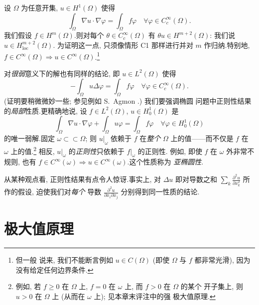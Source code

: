 \begin{remark}
\label{rem:9.25}
设 $\Omega$ 为任意开集, $u\in H^1(\Omega)$ 使得
\begin{equation*}
\int_\Omega\nabla u\cdot\nabla\varphi=\int_\Omega f\varphi
\quad\forall\varphi\in C_c^\infty(\Omega).
\end{equation*}
我们假设 $f\in H^m(\Omega)$.则对每个 $\theta\in C_c^\infty(\Omega)$ 有
$\theta u\in H^{m+2}(\Omega)$: 我们说 $u\in H^{m+2}_{\mathrm{loc}}(\Omega)$.
为证明这一点, 只须像情形 C1 那样进行并对 $m$ 作归纳.特别地,
$f\in C^\infty(\Omega)\Rightarrow u\in C^\infty(\Omega)$.\footnote{但一般
说来, 我们不能断言例如 $u\in C(\Omega)$ (即使 $\Omega$ 与 $f$ 都非常光滑),
因为没有给定任何边界条件.}

对\emph{很弱}意义下的解也有同样的结论, 即 $u\in L^2(\Omega)$ 使得
\begin{equation*}
-\int_\Omega u\Delta\varphi=\int_\Omega f\varphi
\quad\forall\varphi\in C_c^\infty(\Omega).
\end{equation*}
(证明要稍微微妙一些; 参见例如 S.~Agmon .) 我们要强调椭圆
问题中正则性结果的\emph{局部}性质.更精确地说, 设 $f\in L^2(\Omega)$,
$u\in H_0^1(\Omega)$ 是
\begin{equation*}
\int_\Omega\nabla u\cdot\nabla\varphi+\int_\Omega u\varphi
=\int_\Omega f\varphi\quad\forall\varphi\in H_0^1(\Omega)
\end{equation*}
的唯一弱解.固定 $\omega\subset\subset\Omega$; 则 $u|_\omega$ 依赖于 $f$
在\emph{整个} $\Omega$ 上的值——而不仅是 $f$ 在 $\omega$ 上的值.\footnote{例如,
若 $f\ge0$ 在 $\Omega$ 上, $f=0$ 在 $\omega$ 上, 而 $f>0$ 在 $\Omega$ 的某个
开子集上, 则 $u>0$ 在 $\Omega$ 上 (从而在 $\omega$ 上); 见本章末评注中的强
极大值原理.} 相反, $u|_\omega$ 的\emph{正则性}只依赖于 $f|_\omega$ 的正则性.
例如, 即使 $f$ 在 $\omega$ 外非常不规则, 也有
$f\in C^\infty(\omega)\Rightarrow u\in C^\infty(\omega)$.这个性质称为
\emph{亚椭圆性}.
\end{remark}

\begin{remark}
\label{rem:9.26}
从某种观点看, 正则性结果有点令人惊讶.事实上, 对 $\Delta u$ 即对导数之和
$\sum_k\frac{\partial^2u}{\partial x_k^2}$ 所作的假设, 迫使我们对\emph{每个}
导数 $\frac{\partial^2u}{\partial x_i\partial x_j}$ 分别得到同一性质的结论.
\end{remark}

\section{极大值原理}
\label{sec:9.7}

